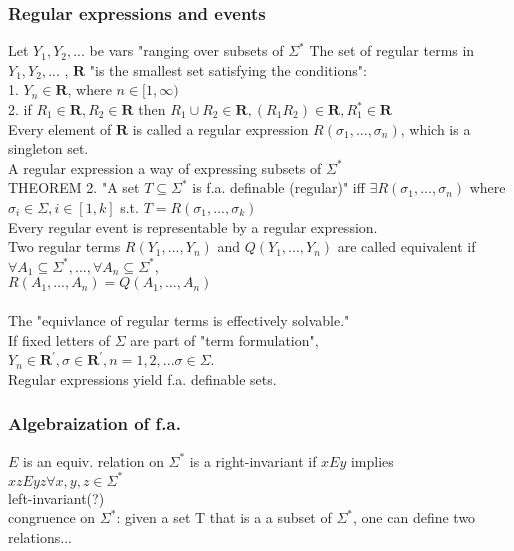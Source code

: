 \subsubsection{Regular expressions and events}
Let $Y_1, Y_2, ...$ be vars "ranging over subsets of $\Sigma^{*}$  The set of regular terms in $Y_1, Y_2, ...$ , $\mathbf{R}$ "is the smallest set satisfying the conditions":\\
1. $Y_n \in \mathbf{R}$, where $n \in [1, \infty)$\\
2. if $R_1 \in \mathbf{R}, R_2 \in \mathbf{R}$ then $R_1 \cup R_2 \in \mathbf{R}, (R_1 R_2) \in \mathbf{R}, R_{1}^{*} \in \mathbf{R}$\\
Every element of $\textbf{R}$ is called a regular expression $R(\sigma_1, ..., \sigma_n)$, which is a singleton set.\\
A regular expression a way of expressing subsets of $\Sigma^*$\\
THEOREM 2. 
"A set $T \subseteq \Sigma^*$ is f.a. definable (regular)" iff $\exists R(\sigma_1, ..., \sigma_n)$ where $\sigma_i \in \Sigma, i \in [1,k]$ s.t. $T = R(\sigma_1, ..., \sigma_k)$\\
Every regular event is representable by a regular expression.\\  
Two regular terms $R(Y_1, ..., Y_n)$ and $Q(Y_1, ..., Y_n)$ are called equivalent if $\forall A_1 \subseteq \Sigma^*, ...,  \forall A_n \subseteq \Sigma^*$,\\
$R(A_1, ..., A_n) = Q(A_1, ..., A_n)$\\
\\
The "equivlance of regular terms is effectively solvable."\\
If fixed letters of $\Sigma$ are part of "term formulation", $Y_n \in \mathbf{R^{'}}, \sigma \in \mathbf{R^{'}}, n = 1,2, ... \sigma \in \Sigma$.\\
Regular expressions yield f.a. definable sets.

\subsubsection{Algebraization of f.a.}
$E$ is an equiv. relation on $\Sigma^{*}$ is a right-invariant if $xEy$ implies $xzEyz \forall x, y, z \in \Sigma^{*}$\\
left-invariant(?)\\
congruence on $\Sigma^{*}$: given a set T that is a a subset of $\Sigma^{*}$, one can define two relations...\\
